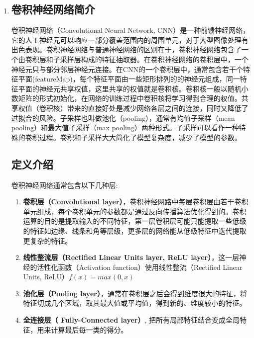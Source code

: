 \documentclass[a4paper,UTF8]{article}
\numberwithin{equation}{section}
\begin{document}
\begin{enumerate}[(1)]
	\item 
	\subsection{卷积神经网络简介}
	卷积神经网络（Convolutional Neural Network, CNN）是一种前馈神经网络，它的人工神经元可以响应一部分覆盖范围内的周围单元，对于大型图像处理有出色表现。卷积神经网络与普通神经网络的区别在于，卷积神经网络包含了一个由卷积层和子采样层构成的特征抽取器。在卷积神经网络的卷积层中，一个神经元只与部分邻层神经元连接。在CNN的一个卷积层中，通常包含若干个特征平面(featureMap)，每个特征平面由一些矩形排列的的神经元组成，同一特征平面的神经元共享权值，这里共享的权值就是卷积核。卷积核一般以随机小数矩阵的形式初始化，在网络的训练过程中卷积核将学习得到合理的权值。共享权值（卷积核）带来的直接好处是减少网络各层之间的连接，同时又降低了过拟合的风险。子采样也叫做池化（pooling），通常有均值子采样（mean pooling）和最大值子采样（max pooling）两种形式。子采样可以看作一种特殊的卷积过程。卷积和子采样大大简化了模型复杂度，减少了模型的参数。
	\subsection{定义介绍}
	卷积神经网络通常包含以下几种层:\\
	\begin{enumerate}
		\item \textbf{卷积层（Convolutional layer）}，卷积神经网路中每层卷积层由若干卷积单元组成，每个卷积单元的参数都是通过反向传播算法优化得到的。卷积运算的目的是提取输入的不同特征，第一层卷积层可能只能提取一些低级的特征如边缘、线条和角等层级，更多层的网络能从低级特征中迭代提取更复杂的特征。
		\item \textbf{线性整流层（Rectified Linear Units layer, ReLU layer）}，这一层神经的活性化函数（Activation function）使用线性整流（Rectified Linear Units, ReLU）$f(x)=max(0,x)$
		\item \textbf{池化层（Pooling layer）}，通常在卷积层之后会得到维度很大的特征，将特征切成几个区域，取其最大值或平均值，得到新的、维度较小的特征。
		\item \textbf{全连接层（ Fully-Connected layer）}, 把所有局部特征结合变成全局特征，用来计算最后每一类的得分。
	\end{enumerate}

\end{enumerate}
\end{document}
